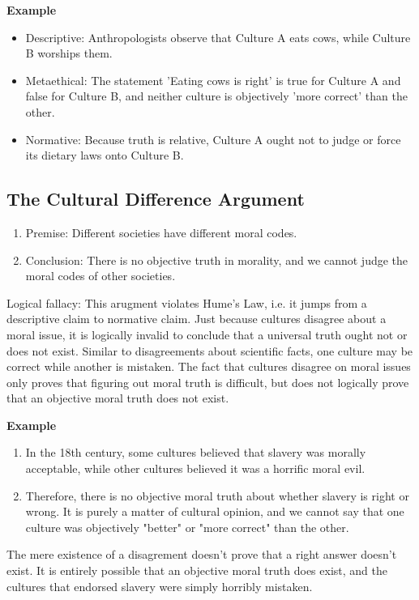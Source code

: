 \documentclass[12pt]{article}
\begin{document}
\noindent\textbf{Example}
\begin{itemize}
    \item Descriptive: Anthropologists observe that Culture A eats cows, while Culture B worships them.
    \item Metaethical: The statement 'Eating cows is right' is true for Culture A and false for Culture B, and neither culture is objectively 'more correct' than the other.
    \item Normative: Because truth is relative, Culture A ought not to judge or force its dietary laws onto Culture B.
\end{itemize}

\subsection{The Cultural Difference Argument}
\begin{enumerate}
    \item Premise: Different societies have different moral codes.
    \item Conclusion: There is no objective truth in morality, and we cannot judge the moral codes of other societies.
\end{enumerate}
Logical fallacy: This arugment violates Hume's Law, i.e. it jumps from a descriptive claim to normative claim.
Just because cultures disagree about a moral issue, it is logically invalid to conclude that a universal truth ought not or does not exist.
Similar to disagreements about scientific facts, one culture may be correct while another is mistaken.
The fact that cultures disagree on moral issues only proves that figuring out moral truth is difficult, but does not logically prove that an objective moral truth does not exist.

\noindent\textbf{Example}
\begin{enumerate}
    \item In the 18th century, some cultures believed that slavery was morally acceptable, while other cultures believed it was a horrific moral evil.
    \item Therefore, there is no objective moral truth about whether slavery is right or wrong. 
    It is purely a matter of cultural opinion, and we cannot say that one culture was objectively "better" or "more correct" than the other.
\end{enumerate}
The mere existence of a disagrement doesn't prove that a right answer doesn't exist. It is entirely possible that 
an objective moral truth does exist, and the cultures that endorsed slavery were simply horribly mistaken.
\end{document}
